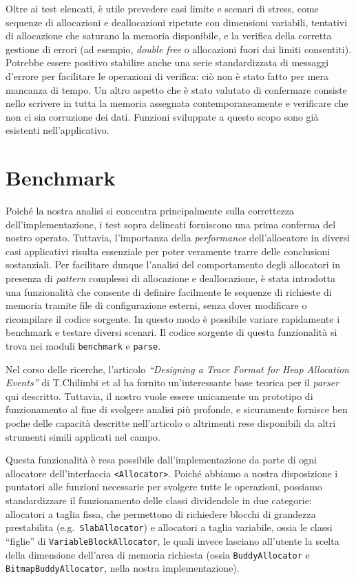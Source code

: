 Oltre ai test elencati, è utile prevedere casi limite e scenari di stress, come sequenze di allocazioni e deallocazioni ripetute con dimensioni variabili, tentativi di allocazione che saturano la memoria disponibile, e la verifica della corretta gestione di errori (ad esempio, \textit{double free} o allocazioni fuori dai limiti consentiti). Potrebbe essere positivo stabilire anche una serie standardizzata di messaggi d'errore per facilitare le operazioni di verifica: ciò non è stato fatto per mera mancanza di tempo. Un altro aspetto che è stato valutato di confermare consiste nello scrivere in tutta la memoria assegnata contemporaneamente e verificare che non ci sia corruzione dei dati. Funzioni sviluppate a questo scopo sono già esistenti nell'applicativo.

\section{Benchmark}
Poiché la nostra analisi si concentra principalmente sulla correttezza dell'implementazione, i test sopra delineati forniscono una prima conferma del nostro operato. Tuttavia, l'importanza della \textit{performance} dell'allocatore in diversi casi applicativi risulta essenziale per poter veramente trarre delle conclusioni sostanziali. Per facilitare dunque l’analisi del comportamento degli allocatori in presenza di \textit{pattern} complessi di allocazione e deallocazione, è stata introdotta una funzionalità che consente di definire facilmente le sequenze di richieste di memoria tramite file di configurazione esterni, senza dover modificare o ricompilare il codice sorgente. In questo modo è possibile variare rapidamente i benchmark e testare diversi scenari. Il codice sorgente di questa funzionalità si trova nei moduli \texttt{benchmark} e \texttt{parse}.

Nel corso delle ricerche, l'articolo \textit{``Designing a Trace Format for Heap Allocation Events''}\cite{chilimbi2000} di T.Chilimbi et al ha fornito un'interessante base teorica per il \textit{parser} qui descritto. Tuttavia, il nostro vuole essere unicamente un prototipo di funzionamento al fine di svolgere analisi più profonde, e sicuramente fornisce ben poche delle capacità descritte nell'articolo o altrimenti rese disponibili da altri strumenti simili applicati nel campo.\footnotemark


Questa funzionalità è resa possibile dall’implementazione da parte di ogni allocatore dell’interfaccia \texttt{<Allocator>}. Poiché abbiamo a nostra disposizione i puntatori alle funzioni necessarie per svolgere tutte le operazioni, possiamo standardizzare il funzionamento delle classi dividendole in due categorie: allocatori a taglia fissa, che permettono di richiedere blocchi di grandezza prestabilita (e.g.\ \texttt{SlabAllocator}) e allocatori a taglia variabile, ossia le classi “figlie” di \texttt{VariableBlockAllocator}, le quali invece lasciano all’utente la scelta della dimensione dell’area di memoria richiesta (ossia \texttt{BuddyAllocator} e \texttt{BitmapBuddyAllocator}, nella nostra implementazione).


